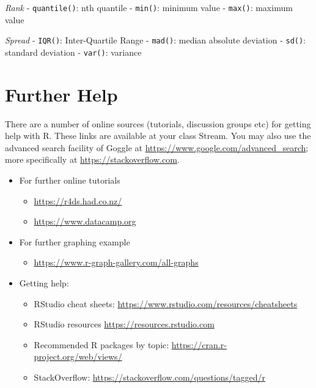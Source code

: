 \documentclass[
  letterpaper,
  DIV=11,
  numbers=noendperiod]{scrreprt}
\providecommand{\tightlist}{%
  \setlength{\itemsep}{0pt}\setlength{\parskip}{0pt}}\usepackage{longtable,booktabs,array}
\begin{document}
\emph{Rank} - \texttt{quantile()}: nth quantile - \texttt{min()}:
minimum value - \texttt{max()}: maximum value

\emph{Spread} - \texttt{IQR()}: Inter-Quartile Range - \texttt{mad()}:
median absolute deviation - \texttt{sd()}: standard deviation -
\texttt{var()}: variance

\hypertarget{further-help}{%
\chapter*{Further Help}\label{further-help}}

There are a number of online sources (tutorials, discussion groups etc)
for getting help with R. These links are available at your class Stream.
You may also use the advanced search facility of Goggle at
\url{https://www.google.com/advanced_search}; more specifically at
\url{https://stackoverflow.com}.

\begin{itemize}
\item
  For further online tutorials

  \begin{itemize}
  \tightlist
  \item
    \url{https://r4ds.had.co.nz/}
  \item
    \url{https://www.datacamp.org}
  \end{itemize}
\item
  For further graphing example

  \begin{itemize}
  \tightlist
  \item
    \url{https://www.r-graph-gallery.com/all-graphs}
  \end{itemize}
\item
  Getting help:

  \begin{itemize}
  \tightlist
  \item
    RStudio cheat sheets:
    \url{https://www.rstudio.com/resources/cheatsheets}
  \item
    RStudio resources \url{https://resources.rstudio.com}
  \item
    Recommended R packages by topic:
    \url{https://cran.r-project.org/web/views/}
  \item
    StackOverflow: \url{https://stackoverflow.com/questions/tagged/r}
  \end{itemize}
\end{itemize}
\end{document}
